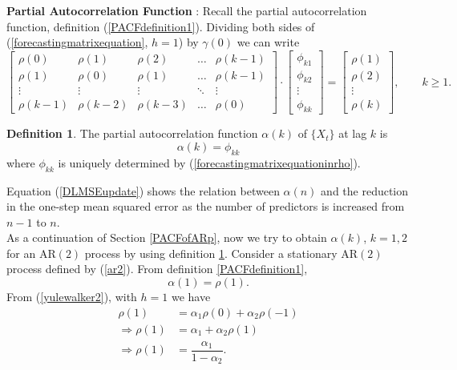 \documentclass[11pt, a4paper]{article}
\numberwithin{equation}{section}
\theoremstyle{definition}
\newtheorem{definition}{Definition}[section]
\begin{document}
\bcattention \hspace{0.1cm} \textbf{Partial Autocorrelation Function} : Recall the partial autocorrelation function, definition (\ref{PACFdefinition1}). Dividing both sides of (\ref{forecastingmatrixequation}, $h = 1$) by $\gamma(0)$ we can write
\begin{equation}\label{forecastingmatrixequationinrho}
\begin{bmatrix}
\rho(0) & \rho(1) & \rho(2) & \ldots & \rho(k-1)\\
\rho(1) & \rho(0) & \rho(1) & \ldots & \rho(k-1)\\
\vdots & \vdots & \vdots & \ddots & \vdots \\
\rho(k-1) & \rho(k-2) & \rho(k-3) & \ldots & \rho(0)
\end{bmatrix}
\cdot
\begin{bmatrix}
\phi_{k1} \\ \phi_{k2} \\ \vdots \\ \phi_{kk}
\end{bmatrix}
=
\begin{bmatrix}
\rho(1) \\ \rho(2) \\ \vdots \\ \rho(k)
\end{bmatrix} , \qquad k \geq 1.
\end{equation}

\begin{definition}\label{PACFdenfinition2}
The partial autocorrelation function $\alpha(k)$ of $\{X_t\}$ at lag $k$ is
$$\alpha(k) = \phi_{kk}$$
where $\phi_{kk}$ is uniquely determined by (\ref{forecastingmatrixequationinrho}).
\end{definition}

Equation (\ref{DLMSEupdate}) shows the relation between $\alpha(n)$ and the reduction in the one-step mean squared error as the number of predictors is increased from $n-1$ to $n$. \\[0.2em]

As a continuation of Section \ref{PACFofARp}, now we try to obtain $\alpha(k)$, $k = 1, 2$ for an AR$(2)$ process by using definition \ref{PACFdenfinition2}. Consider a stationary AR$(2)$ process defined by (\ref{ar2}). From definition \ref{PACFdefinition1}, 
$$\alpha(1) = \rho(1).$$
From (\ref{yulewalker2}), with $h = 1$ we have
\begin{align*}
\rho(1) &= \alpha_1 \rho(0) + \alpha_2 \rho(-1) \\[0.2em]
\Rightarrow \rho(1) &= \alpha_1 + \alpha_2 \rho(1) \\[0.2em]
\Rightarrow \rho(1) &= \dfrac{\alpha_1}{1 - \alpha_2}.
\end{align*}
\end{document}
